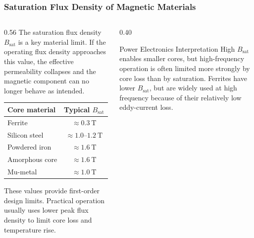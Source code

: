 \begin{frame} 
    \frametitle{Saturation Flux Density of Magnetic Materials} 
    \begin{columns} 
        \begin{column}{0.56\textwidth} 
            The saturation flux density $B_{\mathrm{sat}}$ is a key material limit. If the operating flux density approaches this value, the effective permeability collapses and the magnetic component can no longer behave as intended. 
            \vspace{0.15cm} 
            \begin{table} 
                \centering 
                \small 
                \begin{tabular}{lc} 
                    \hline 
                    \textbf{Core material} & \textbf{Typical $B_{\mathrm{sat}}$}\\ 
                    \hline 
                    Ferrite & $\approx 0.3\ \si{\tesla}$\\
                    Silicon steel & $\approx 1.0$--$1.2\ \si{\tesla}$\\ 
                    Powdered iron & $\approx 1.6\ \si{\tesla}$\\ 
                    Amorphous core & $\approx 1.6\ \si{\tesla}$\\ 
                    Mu-metal & $\approx 1.0\ \si{\tesla}$\\ \hline 
                \end{tabular} 
            \end{table} 
            \vspace{0.1cm} 
            These values provide first-order design limits. Practical operation usually uses lower peak flux density to limit core loss and temperature rise. 
        \end{column} 
        \begin{column}{0.40\textwidth} 
            \begin{block}{Power Electronics Interpretation} 
                \small High $B_{\mathrm{sat}}$ enables smaller cores, but high-frequency operation is often limited more strongly by core loss than by saturation. Ferrites have lower $B_{\mathrm{sat}}$, but are widely used at high frequency because of their relatively low eddy-current loss. 
            \end{block} 
         \end{column} 
    \end{columns} 
\end{frame}

